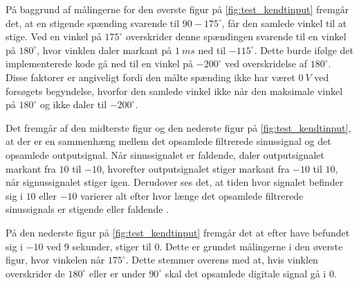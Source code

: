 På baggrund af målingerne for den øverste figur på \autoref{fig:test_kendtinput} fremgår det, at en stigende spænding svarende til $90-175^{\circ}$, får den samlede vinkel til at stige. Ved en vinkel på $175^{\circ}$ overskrider denne spændingen svarende til en vinkel på $180^{\circ}$, hvor vinklen daler markant på $1~ms$ ned til $-115^{\circ}$. 
Dette burde ifølge det implementerede kode gå ned til en vinkel på $-200^{\circ}$ ved overskridelse af $180^{\circ}$.
Disse faktorer er angiveligt fordi den målte spænding ikke har været $0~V$ ved forsøgets begyndelse, hvorfor den samlede vinkel ikke når den maksimale vinkel på $180^{\circ}$ og ikke daler til $-200^{\circ}$.

Det fremgår af den midterste figur og den nederste figur på \autoref{fig:test_kendtinput}, at der er en sammenhæng mellem det opsamlede filtrerede sinussignal og det opsamlede outputsignal. Når sinussignalet er faldende, daler outputsignalet markant fra $10$ til $-10$, hvorefter outputsignalet stiger markant fra $-10$ til $10$, når signussignalet stiger igen. Derudover ses det, at tiden hvor signalet befinder sig i $10$ eller $-10$ varierer alt efter hvor længe det opsamlede filtrerede sinussignals er stigende eller faldende .

På den nederste figur på \autoref{fig:test_kendtinput} fremgår det at efter have befundet sig i $-10$ ved 9 sekunder, stiger til $0$. Dette er grundet målingerne i den øverste figur, hvor vinkelen når $175^{\circ}$. Dette stemmer overens med at, hvis vinklen  overskrider de $180^{\circ}$ eller er under $90^{\circ}$ skal det opsamlede digitale signal gå i $0$. 